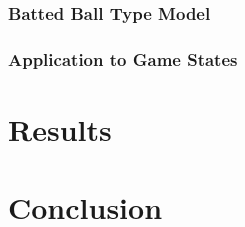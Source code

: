 \documentclass[12pt]{article}
\begin{document}
\subsubsection{Batted Ball Type Model}


\subsubsection{Application to Game States}

\section{Results}

\section{Conclusion}



\printbibliography[title={References}]
\end{document}
